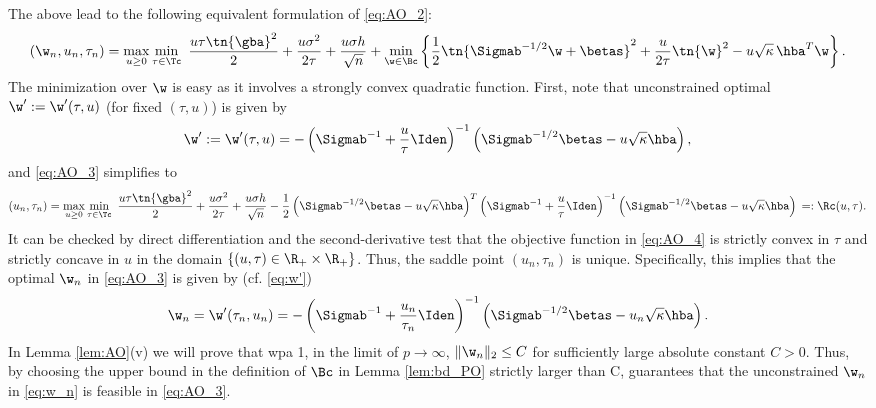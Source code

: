 The above lead to the following equivalent formulation of \eqref{eq:AO_2}:
\begin{align}
\left(\w_n,u_n,\tau_n\right) = \max_{u\geq 0}\min_{\tau\in\Tc} ~ \frac{u\tau\tn{\gba}^2}{2} + \frac{u\sigma^2}{2\tau} + \frac{u\sigma h}{\sqrt{n}} + \min_{\w\in\Bc} \left\{ \frac{1}{2}\tn{\Sigmab^{-1/2}\w+\betas}^2 + \frac{u}{2\tau}\tn{\w}^2 - u \sqrt{\kappa}\,{\hba}^T\w \right\} .\label{eq:AO_3}
\end{align}
The minimization over $\w$ is easy as it involves a strongly convex quadratic function. First, note that unconstrained optimal $\w':=\w'(\tau,u)$ (for fixed $(\tau,u)$) is given by
\begin{align}\label{eq:w'}
\w':=\w'(\tau,u) = -\left(\Sigmab^{-1}+\frac{u}{\tau}\Iden\right)^{-1}\left(\Sigmab^{-1/2}\betas-u\sqrt{\kappa}\hba\right), 
\end{align}
and \eqref{eq:AO_3} simplifies to
\begin{align}
\left(u_n,\tau_n\right)=\max_{u\geq 0}\min_{\tau\in\Tc} ~ \frac{u\tau\tn{\gba}^2}{2} + \frac{u\sigma^2}{2\tau} + \frac{u\sigma h}{\sqrt{n}} - \frac{1}{2} \left(\Sigmab^{-1/2}\betas-u\sqrt{\kappa}\hba\right)^T\left(\Sigmab^{-1}+\frac{u}{\tau}\Iden\right)^{-1} \left(\Sigmab^{-1/2}\betas-u\sqrt{\kappa}\hba\right)\,=:\Rc(u,\tau) .\label{eq:AO_4}
\end{align}
It can be checked by direct differentiation and the second-derivative test that the objective function in \eqref{eq:AO_4} is strictly convex in $\tau$ and strictly concave in $u$ in the domain $\{(u,\tau)\in\R_+\times\R_+\}$. Thus, the saddle point $(u_n,\tau_n)$ is unique. Specifically, this implies that the optimal $\w_n$ in \eqref{eq:AO_3} is given by (cf. \eqref{eq:w'})
\begin{align}\label{eq:w_n}
\w_n=\w'(\tau_n,u_n) = -\left(\Sigmab^{-1}+\frac{u_n}{\tau_n}\Iden\right)^{-1}\left(\Sigmab^{-1/2}\betas-u_n\sqrt{\kappa}\hba\right).
\end{align}
In Lemma \ref{lem:AO}(v) we will prove that wpa 1, in the limit of $p\rightarrow\infty$, $\|\w_n\|_2\leq C$ for sufficiently large absolute constant $C>0$. Thus, by choosing the upper bound in the definition of $\Bc$ in Lemma \ref{lem:bd_PO} strictly larger than C, guarantees that the unconstrained $\w_n$ in \eqref{eq:w_n} is feasible in \eqref{eq:AO_3}.

